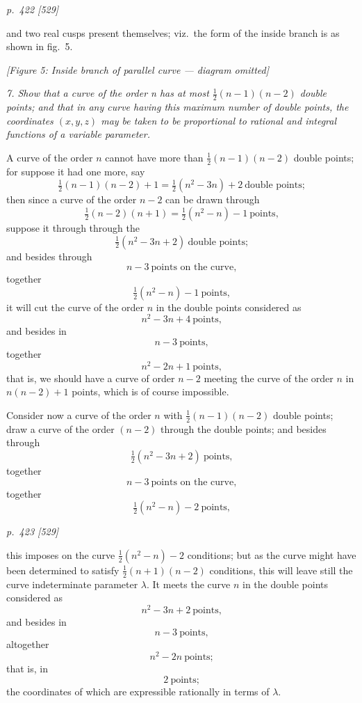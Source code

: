 \documentclass[11pt,a4paper]{book}
\begin{document}
\clearpage

\bigskip
\textit{p.~422 [529]}
\smallskip

and two real cusps present themselves; viz.\ the form of the inside branch is as shown
in fig.~5.

\begin{center}
\textit{[Figure 5: Inside branch of parallel curve --- diagram omitted]}
\end{center}

\textit{7. Show that a curve of the order n has at most $\tfrac{1}{2}(n-1)(n-2)$ double points;
and that in any curve having this maximum number of double points, the coordinates
$(x, y, z)$ may be taken to be proportional to rational and integral functions of a variable
parameter.}

A curve of the order $n$ cannot have more than $\tfrac{1}{2}(n-1)(n-2)$ double points; for
suppose it had one more, say
\[
\tfrac{1}{2}(n-1)(n-2) + 1 = \tfrac{1}{2}(n^2 - 3n) + 2\ \text{double points;}
\]
then since a curve of the order $n - 2$ can be drawn through
\[
\tfrac{1}{2}(n-2)(n+1) = \tfrac{1}{2}(n^2 - n) - 1\ \text{points,}
\]
suppose it through through the
\[
\tfrac{1}{2}(n^2 - 3n + 2)\ \text{double points;}
\]
and besides through
\[
n - 3\ \text{points on the curve,}
\]
together
\[
\tfrac{1}{2}(n^2 - n) - 1\ \text{points,}
\]
it will cut the curve of the order $n$ in the double points considered as
\[
n^2 - 3n + 4\ \text{points,}
\]
and besides in
\[
n - 3\ \text{points,}
\]
together
\[
n^2 - 2n + 1\ \text{points,}
\]
that is, we should have a curve of order $n - 2$ meeting the curve of the order $n$ in
$n(n-2) + 1$ points, which is of course impossible.

Consider now a curve of the order $n$ with $\tfrac{1}{2}(n-1)(n-2)$ double points; draw a
curve of the order $(n-2)$ through the double points; and
besides through
\[
\tfrac{1}{2}(n^2 - 3n + 2)\ \text{points,}
\]
together
\[
n - 3\ \text{points on the curve,}
\]
together
\[
\tfrac{1}{2}(n^2 - n) - 2\ \text{points,}
\]

\clearpage

\bigskip
\textit{p.~423 [529]}
\smallskip

this imposes on the curve $\tfrac{1}{2}(n^2 - n) - 2$ conditions; but as the curve might have been
determined to satisfy $\tfrac{1}{2}(n+1)(n-2)$ conditions, this will leave still the curve indeterminate
parameter $\lambda$. It meets the curve $n$ in the double points considered as
\[
n^2 - 3n + 2\ \text{points,}
\]
and besides in
\[
n - 3\ \text{points,}
\]
altogether
\[
n^2 - 2n\ \text{points;}
\]
that is, in
\[
2\ \text{points;}
\]
the coordinates of which are expressible rationally in terms of $\lambda$.
\end{document}
